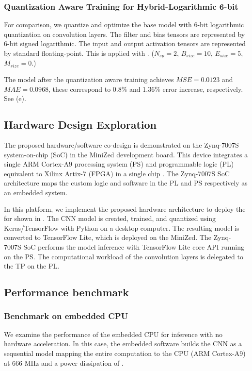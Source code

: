 \subsubsection{Quantization Aware Training for Hybrid-Logarithmic 6-bit}
For comparison, we quantize and optimize the base model with 6-bit logarithmic quantization on convolution layers. The filter and bias tensors are represented by 6-bit signed logarithmic. The input and output activation tensors are represented by standard floating-point. This is applied with . ($N_{ep}=2$, $B_{size}=10$, $E_{size}=5$, $M_{size}=0$.)

The model after the quantization aware training achieves $MSE=0.0123$ and $MAE=0.0968$, these correspond to 0.8\% and 1.36\% error increase, respectively. See (e).

\subsection{Hardware Design Exploration}
The proposed hardware/software co-design is demonstrated on the Zynq-7007S system-on-chip (SoC) in the MiniZed development board. This device integrates a single ARM Cortex-A9 processing system (PS) and programmable logic (PL) equivalent to Xilinx Artix-7 (FPGA) in a single chip \cite{xilinx2015zynq}. The Zynq-7007S SoC architecture maps the custom logic and software in the PL and PS respectively as an embedded system.

In this platform, we implement the proposed hardware architecture to deploy the  for  shown in . The CNN model is created, trained, and quantized using Keras/TensorFlow with Python on a desktop computer. The resulting model is converted to TensorFlow Lite, which is deployed on the MiniZed. The Zynq-7007S SoC performs the model inference with TensorFlow Lite core API running on the PS. The computational workload of the convolution layers is delegated to the TP on the PL.

\subsection{Performance benchmark}
\subsubsection{Benchmark on embedded CPU}

We examine the performance of the embedded CPU for inference with no hardware acceleration. In this case, the embedded software builds the CNN as a sequential model mapping the entire computation to the CPU (ARM Cortex-A9) at 666 MHz and a power dissipation of .

